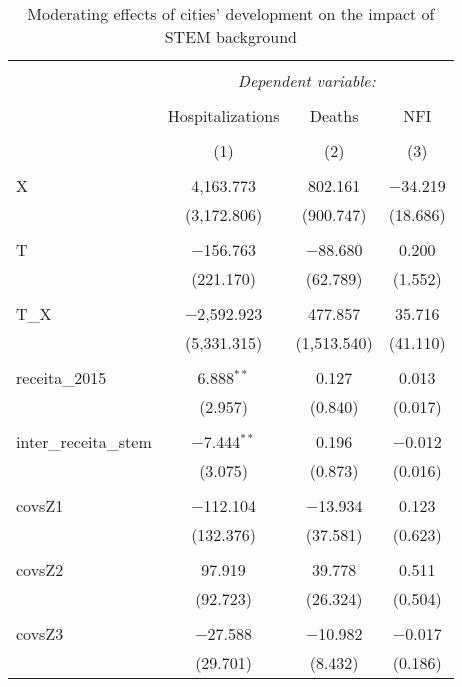 
\begin{table}[!htbp] \centering 
  \caption{Moderating effects of cities’ development on the impact of STEM background} 
  \label{} 
\begin{tabular}{@{\extracolsep{5pt}}lccc} 
\\[-1.8ex]\hline 
\hline \\[-1.8ex] 
 & \multicolumn{3}{c}{\textit{Dependent variable:}} \\ 
\cline{2-4} 
\\[-1.8ex] & Hospitalizations & Deaths & NFI \\ 
\\[-1.8ex] & (1) & (2) & (3)\\ 
\hline \\[-1.8ex] 
 X & 4,163.773 & 802.161 & $-$34.219 \\ 
  & (3,172.806) & (900.747) & (18.686) \\ 
  & & & \\ 
 T & $-$156.763 & $-$88.680 & 0.200 \\ 
  & (221.170) & (62.789) & (1.552) \\ 
  & & & \\ 
 T\_X & $-$2,592.923 & 477.857 & 35.716 \\ 
  & (5,331.315) & (1,513.540) & (41.110) \\ 
  & & & \\ 
 receita\_2015 & 6.888$^{**}$ & 0.127 & 0.013 \\ 
  & (2.957) & (0.840) & (0.017) \\ 
  & & & \\ 
 inter\_receita\_stem & $-$7.444$^{**}$ & 0.196 & $-$0.012 \\ 
  & (3.075) & (0.873) & (0.016) \\ 
  & & & \\ 
 covsZ1 & $-$112.104 & $-$13.934 & 0.123 \\ 
  & (132.376) & (37.581) & (0.623) \\ 
  & & & \\ 
 covsZ2 & 97.919 & 39.778 & 0.511 \\ 
  & (92.723) & (26.324) & (0.504) \\ 
  & & & \\ 
 covsZ3 & $-$27.588 & $-$10.982 & $-$0.017 \\ 
  & (29.701) & (8.432) & (0.186) \\ 

\end{tabular}
\end{table}
